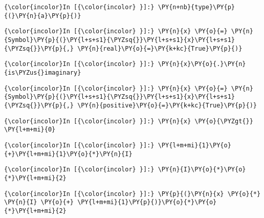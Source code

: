     \begin{Verbatim}[commandchars=\\\{\}]
{\color{incolor}In [{\color{incolor} }]:} \PY{n+nb}{type}\PY{p}{(}\PY{n}{a}\PY{p}{)}
\end{Verbatim}



    \begin{Verbatim}[commandchars=\\\{\}]
{\color{incolor}In [{\color{incolor} }]:} \PY{n}{x} \PY{o}{=} \PY{n}{Symbol}\PY{p}{(}\PY{l+s+s1}{\PYZsq{}}\PY{l+s+s1}{x}\PY{l+s+s1}{\PYZsq{}}\PY{p}{,} \PY{n}{real}\PY{o}{=}\PY{k+kc}{True}\PY{p}{)}
\end{Verbatim}

    \begin{Verbatim}[commandchars=\\\{\}]
{\color{incolor}In [{\color{incolor} }]:} \PY{n}{x}\PY{o}{.}\PY{n}{is\PYZus{}imaginary}
\end{Verbatim}

    \begin{Verbatim}[commandchars=\\\{\}]
{\color{incolor}In [{\color{incolor} }]:} \PY{n}{x} \PY{o}{=} \PY{n}{Symbol}\PY{p}{(}\PY{l+s+s1}{\PYZsq{}}\PY{l+s+s1}{x}\PY{l+s+s1}{\PYZsq{}}\PY{p}{,} \PY{n}{positive}\PY{o}{=}\PY{k+kc}{True}\PY{p}{)}
\end{Verbatim}

    \begin{Verbatim}[commandchars=\\\{\}]
{\color{incolor}In [{\color{incolor} }]:} \PY{n}{x} \PY{o}{\PYZgt{}} \PY{l+m+mi}{0}
\end{Verbatim}





    \begin{Verbatim}[commandchars=\\\{\}]
{\color{incolor}In [{\color{incolor} }]:} \PY{l+m+mi}{1}\PY{o}{+}\PY{l+m+mi}{1}\PY{o}{*}\PY{n}{I}
\end{Verbatim}

    \begin{Verbatim}[commandchars=\\\{\}]
{\color{incolor}In [{\color{incolor} }]:} \PY{n}{I}\PY{o}{*}\PY{o}{*}\PY{l+m+mi}{2}
\end{Verbatim}

    \begin{Verbatim}[commandchars=\\\{\}]
{\color{incolor}In [{\color{incolor} }]:} \PY{p}{(}\PY{n}{x} \PY{o}{*} \PY{n}{I} \PY{o}{+} \PY{l+m+mi}{1}\PY{p}{)}\PY{o}{*}\PY{o}{*}\PY{l+m+mi}{2}
\end{Verbatim}





